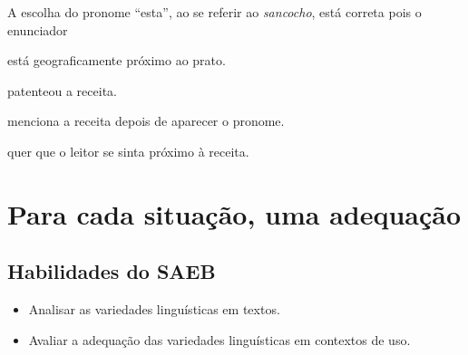 \noindent A escolha do pronome ``esta'', ao se referir ao \emph{sancocho},
está correta pois o enunciador

\begin{escolha}
\item está geograficamente próximo ao prato.
\item patenteou a receita.
\item menciona a receita depois de aparecer o pronome.
\item quer que o leitor se sinta próximo à receita.
\end{escolha}



\chapter{Para cada situação, uma adequação}

\section*{Habilidades do SAEB }
\begin{itemize}
\item Analisar as variedades linguísticas em textos. 
\item Avaliar a adequação das variedades linguísticas em contextos de uso.
\end{itemize}

